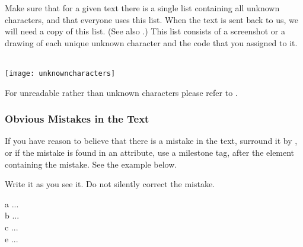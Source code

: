 \begin{note}
Make sure that for a given text there is a single list containing all unknown characters, and that everyone uses this list. When the text is sent back to us, we will need a copy of this list. (See also .) This list consists of a screenshot or a drawing of each unique unknown character and the code that you assigned to it.
\end{note}

\parbox{\linewidth}{{} \\[3mm] \texttt{[image: unknowncharacters]}}


\begin{crossref}
For unreadable rather than unknown characters please refer to .
\end{crossref}

\subsubsection{Obvious Mistakes in the Text}
\label{section obvious mistakes}

\begin{mainrule}
If you have reason to believe that there is a mistake in the text, surround it by , or if the mistake is found in an attribute, use a milestone tag,  after the element containing the mistake. See the example below.
\end{mainrule}

\begin{clarification}
Write it as you see it. Do not silently correct the mistake.
\end{clarification}

\vspace{3mm}
\begin{example}

\vspace{-5mm}
\begin{typeLatin}
 a ...  \\
 b ...  \\
 c ...  \\
 e ... 
\end{typeLatin}
\end{example}


